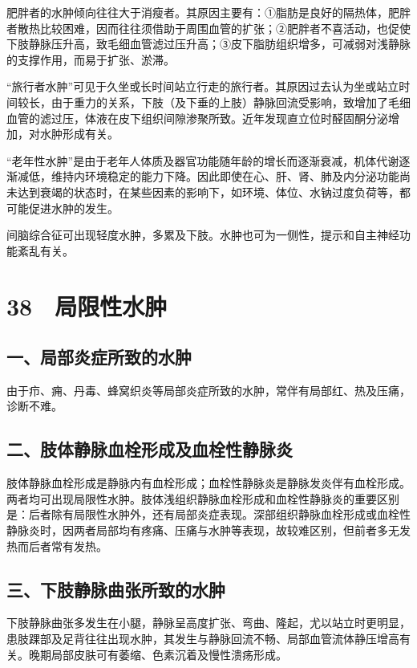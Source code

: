 肥胖者的水肿倾向往往大于消瘦者。其原因主要有：①脂肪是良好的隔热体，肥胖者散热比较困难，因而往往须借助于周围血管的扩张；②肥胖者不喜活动，也促使下肢静脉压升高，致毛细血管滤过压升高；③皮下脂肪组织增多，可减弱对浅静脉的支撑作用，而易于扩张、淤滞。

“旅行者水肿”可见于久坐或长时间站立行走的旅行者。其原因过去认为坐或站立时间较长，由于重力的关系，下肢（及下垂的上肢）静脉回流受影响，致增加了毛细血管的滤过压，体液在皮下组织间隙渗聚所致。近年发现直立位时醛固酮分泌增加，对水肿形成有关。

“老年性水肿”是由于老年人体质及器官功能随年龄的增长而逐渐衰减，机体代谢逐渐减低，维持内环境稳定的能力下降。因此即使在心、肝、肾、肺及内分泌功能尚未达到衰竭的状态时，在某些因素的影响下，如环境、体位、水钠过度负荷等，都可能促进水肿的发生。

间脑综合征可出现轻度水肿，多累及下肢。水肿也可为一侧性，提示和自主神经功能紊乱有关。

\protect\hypertarget{text00105.html}{}{}

\section{38　局限性水肿}

\subsection{一、局部炎症所致的水肿}

由于疖、痈、丹毒、蜂窝织炎等局部炎症所致的水肿，常伴有局部红、热及压痛，诊断不难。

\subsection{二、肢体静脉血栓形成及血栓性静脉炎}

肢体静脉血栓形成是静脉内有血栓形成；血栓性静脉炎是静脉发炎伴有血栓形成。两者均可出现局限性水肿。肢体浅组织静脉血栓形成和血栓性静脉炎的重要区别是：后者除有局限性水肿外，还有局部炎症表现。深部组织静脉血栓形成或血栓性静脉炎时，因两者局部均有疼痛、压痛与水肿等表现，故较难区别，但前者多无发热而后者常有发热。

\subsection{三、下肢静脉曲张所致的水肿}

下肢静脉曲张多发生在小腿，静脉呈高度扩张、弯曲、隆起，尤以站立时更明显，患肢踝部及足背往往出现水肿，其发生与静脉回流不畅、局部血管流体静压增高有关。晚期局部皮肤可有萎缩、色素沉着及慢性溃疡形成。


